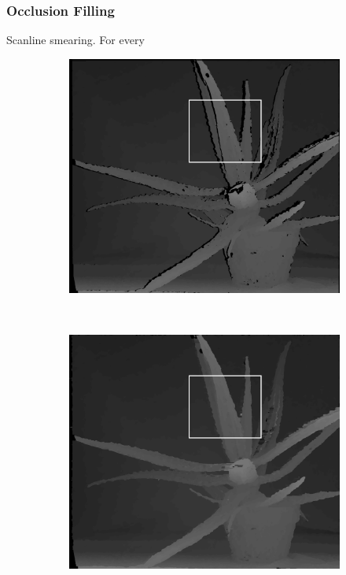 \subsubsection{Occlusion Filling}

Scanline smearing. For every

\begin{figure}

  \begin{subfigure}[b]{0.48\textwidth}
    \centering
    \includegraphics[width=\textwidth]{images/no-fill.png}
  \end{subfigure}
  ~
  \begin{subfigure}[b]{0.48\textwidth}
    \centering
    \includegraphics[width=\textwidth]{images/fill.png}
  \end{subfigure}


\end{figure}
